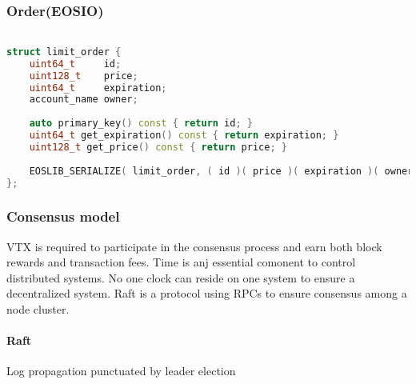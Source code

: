 \documentclass[]{article}
\begin{document}
\subsubsection{Order(EOSIO)}
\begin{lstlisting}[language=C++, caption={C++ code using listings}]

struct limit_order {
	uint64_t     id;
	uint128_t    price;
	uint64_t     expiration;
	account_name owner;
	
	auto primary_key() const { return id; }
	uint64_t get_expiration() const { return expiration; }
	uint128_t get_price() const { return price; }
	
	EOSLIB_SERIALIZE( limit_order, ( id )( price )( expiration )( owner ) )
};

\end{lstlisting}

\subsubsection{Consensus model}
VTX is required to participate in the consensus process and earn both block rewards and transaction fees.
Time is anj essential comonent to control distributed systems.
No one clock can reside on one system to ensure a decentralized system.
Raft is a protocol using RPCs to ensure consensus among a node cluster.\\
\paragraph{Raft}
Log propagation punctuated by leader election\\
\end{document}
